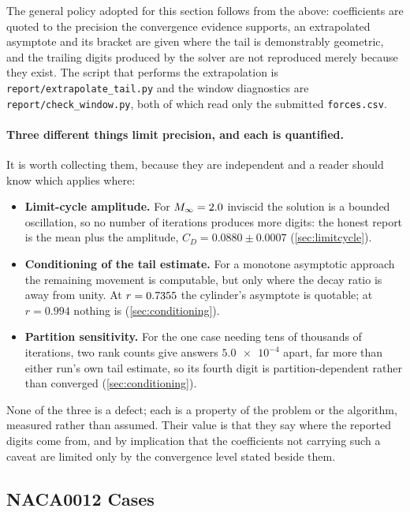 The general policy adopted for this section follows from the above: coefficients are
quoted to the precision the convergence evidence supports, an extrapolated asymptote
and its bracket are given where the tail is demonstrably geometric, and the trailing
digits produced by the solver are not reproduced merely because they exist. The
script that performs the extrapolation is \texttt{report/extrapolate\_tail.py} and
the window diagnostics are \texttt{report/check\_window.py}, both of which read only
the submitted \texttt{forces.csv}.

\paragraph{Three different things limit precision, and each is quantified.} It is worth
collecting them, because they are independent and a reader should know which applies where:

\begin{itemize}
  \item \textbf{Limit-cycle amplitude.} For $M_\infty=2.0$ inviscid the solution is a bounded
  oscillation, so no number of iterations produces more digits: the honest report is the mean
  plus the amplitude, $C_D=0.0880\pm0.0007$ (\cref{sec:limitcycle}).
  \item \textbf{Conditioning of the tail estimate.} For a monotone asymptotic approach the
  remaining movement is computable, but only where the decay ratio is away from unity. At
  $r=\num{0.7355}$ the cylinder's asymptote is quotable; at $r=0.994$ nothing is
  (\cref{sec:conditioning}).
  \item \textbf{Partition sensitivity.} For the one case needing tens of thousands of
  iterations, two rank counts give answers $\num{5.0e-4}$ apart, far more than either run's
  own tail estimate, so its fourth digit is partition-dependent rather than converged
  (\cref{sec:conditioning}).
\end{itemize}

None of the three is a defect; each is a property of the problem or the algorithm, measured
rather than assumed. Their value is that they say where the reported digits come from, and
by implication that the coefficients not carrying such a caveat are limited only by the
convergence level stated beside them.

\subsection{NACA0012 Cases}
\label{sec:naca}

